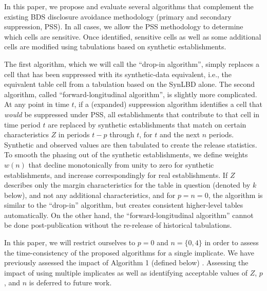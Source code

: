 In this paper, we propose and evaluate several algorithms that complement the existing 
\ac{BDS} disclosure avoidance methodology (primary and secondary suppression, PSS). In all 
cases, we allow the PSS methodology to determine which cells are sensitive. Once identified, 
sensitive cells as well as some additional cells are modified using tabulations based on synthetic 
establishments.  

The first algorithm, which we will call the ``drop-in algorithm'', simply replaces a cell that has 
been suppressed with its synthetic-data equivalent, i.e., the equivalent table cell from a 
tabulation based on the \ac{SynLBD} alone. The second algorithm, called 
``forward-longitudinal algorithm'', is slightly more complicated. At any point in time $t$, if a 
(expanded) suppression algorithm identifies a cell that \emph{would} be suppressed under 
PSS, all 
establishments that contribute to that cell in  time period $t$ are replaced by synthetic 
establishments that match on certain characteristics $Z$ in periods $t-p$ through $t$, for $t$ 
and the next $n$ periods. Synthetic and observed values are then tabulated to create the 
release statistics. To smooth the phasing out of the synthetic establishments, we define weights 
$w(n)$ that decline monotonically from unity to zero for synthetic establishments, and increase 
correspondingly for real establishments. 
If $Z$ 
describes only the margin characteristics for the table in question 
(denoted by $k$ below), and not any additional characteristics, and for $p=n=0$, the algorithm 
is similar to the ``drop-in'' algorithm, but creates consistent higher-level tables automatically. 
On the other hand, the ``forward-longitudinal algorithm'' cannot be done post-publication 
without the re-release of historical tabulations.

In this paper, we will restrict ourselves to $p=0$ and $n=\lbrace 0,4 \rbrace$ in order to assess the 
time-consistency of the proposed algorithms for a single implicate.
We have 
previously assessed the impact of Algorithm 1 (defined below)  \cite{psd2014a}.
Assessing the impact of using multiple implicates as well as identifying 
acceptable values of $Z$, $p$, and $n$ is deferred to  future work.

